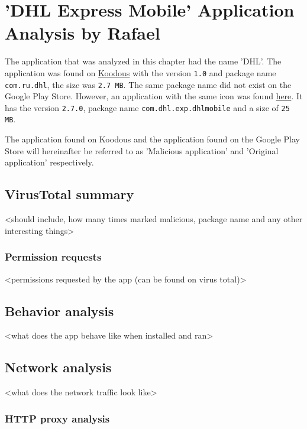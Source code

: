 \section{'DHL Express Mobile' Application Analysis by Rafael}

The application that was analyzed in this chapter had the name 'DHL'.
The application was found on \href{https://koodous.com/apks/38ff459a46e9ea6d63a83c1eddb640626fef562cd1bcb0ab3823c4770d07d0fb}{Koodous} with the version \texttt{1.0} and package name \texttt{com.ru.dhl}, the size was \texttt{2.7 MB}.
The same package name did not exist on the Google Play Store. However, an application with the same icon was found \href{https://play.google.com/store/apps/details?id=com.dhl.exp.dhlmobile}{here}. It has the version \texttt{2.7.0}, package name \texttt{com.dhl.exp.dhlmobile} and a size of \texttt{25 MB}.

The application found on Koodous and the application found on the Google Play Store will hereinafter be referred to as 'Malicious application' and 'Original application' respectively.

\newpage
\subsection{VirusTotal summary}

<should include, how many times marked malicious, package name and any other interesting things>

\subsubsection{Permission requests}

<permissions requested by the app (can be found on virus total)>

\newpage
\subsection{Behavior analysis}

<what does the app behave like when installed and ran>

\newpage
\subsection{Network analysis}

<what does the network traffic look like>

\subsubsection{HTTP proxy analysis}

